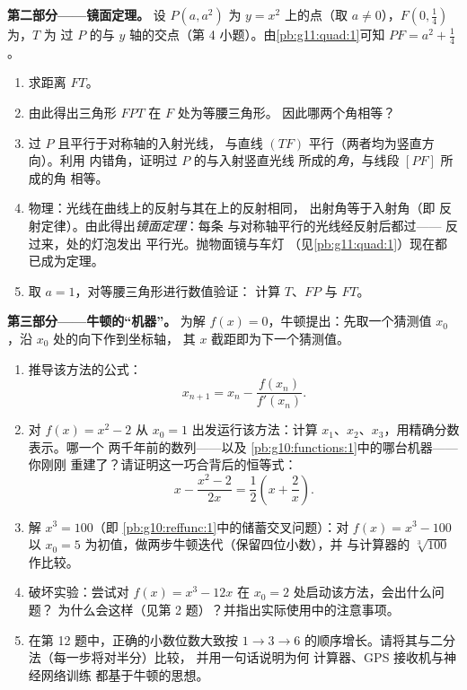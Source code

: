 \begin{problem}
\medskip
\noindent\textbf{第二部分——镜面定理。}
设 $P(a, a^2)$ 为 $y = x^2$ 上的点（取
$a \neq 0$），$F\left(0, \frac14\right)$ 为，$T$ 为
过 $P$ 的与 $y$ 轴的交点（第
4 小题）。由\cref{pb:g11:quad:1}可知
$PF = a^2 + \frac14$。
\begin{enumerate}[resume]
  \item 求距离 $FT$。
  \item 由此得出三角形 $FPT$ 在 $F$ 处为等腰三角形。
        因此哪两个角相等？
  \item 过 $P$ 且平行于对称轴的入射光线，
        与直线 $(TF)$ 平行（两者均为竖直方向）。利用
        内错角，证明过 $P$ 的与入射竖直光线
        所成的\emph{角}，与线段 $[PF]$ 所成的角
        相等。
  \item 物理：光线在曲线上的反射与其在上的反射相同，
        出射角等于入射角（即
        反射定律）。由此得出\emph{镜面定理}：每条
        与对称轴平行的光线经反射后都过——
        反过来，处的灯泡发出
        平行光。抛物面镜与车灯
        （见\cref{pb:g11:quad:1}）现在都已成为定理。
  \item 取 $a = 1$，对等腰三角形进行数值验证：
        计算 $T$、$FP$ 与 $FT$。
\end{enumerate}

\medskip
\noindent\textbf{第三部分——牛顿的“机器”。}
为解 $f(x) = 0$，牛顿提出：先取一个猜测值
$x_0$，沿 $x_0$ 处的向下作到坐标轴，
其 $x$ 截距即为下一个猜测值。
\begin{enumerate}[resume]
  \item 推导该方法的公式：
        \[
        x_{n + 1} = x_n - \frac{f(x_n)}{f'(x_n)} .
        \]
  \item 对 $f(x) = x^2 - 2$ 从 $x_0 = 1$ 出发运行该方法：计算
        $x_1$、$x_2$、$x_3$，用精确分数表示。哪一个
        两千年前的数列——以及
        \cref{pb:g10:functions:1}中的哪台机器——你刚刚
        重建了？请证明这一巧合背后的恒等式：
        \[
        x - \frac{x^2 - 2}{2x} = \frac12\left(x +
        \frac2x\right).
        \]
  \item 解 $x^3 = 100$（即
        \cref{pb:g10:reffunc:1}中的储蓄交叉问题）：对
        $f(x) = x^3 - 100$ 以 $x_0 = 5$ 为初值，做两步牛顿迭代（保留四位小数），并
        与计算器的 $\sqrt[3]{100}$ 作比较。
  \item 破坏实验：尝试对
        $f(x) = x^3 - 12x$ 在 $x_0 = 2$ 处启动该方法，会出什么问题？
        为什么会这样（见第 2 题）？并指出实际使用中的注意事项。
  \item 在第 12 题中，正确的小数位数大致按
        $1 \to 3 \to 6$ 的顺序增长。请将其与二分法（每一步将对半分）比较，
        并用一句话说明为何
        计算器、GPS 接收机与神经网络训练
        都基于牛顿的思想。
\end{enumerate}


\end{problem}
